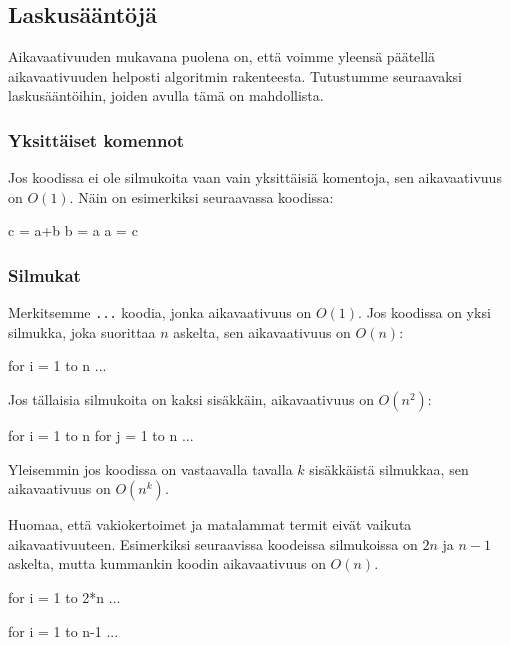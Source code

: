 \subsection{Laskusääntöjä}

Aikavaativuuden mukavana puolena on, että voimme yleensä
päätellä aikavaativuuden helposti algoritmin
rakenteesta. Tutustumme seuraavaksi laskusääntöihin,
joiden avulla tämä on mahdollista.

\subsubsection{Yksittäiset komennot}

Jos koodissa ei ole silmukoita vaan vain
yksittäisiä komentoja, sen aikavaativuus on $O(1)$.
Näin on esimerkiksi seuraavassa koodissa:

\begin{code}
c = a+b
b = a
a = c
\end{code}

\subsubsection{Silmukat}

Merkitsemme \texttt{...} koodia,
jonka aikavaativuus on $O(1)$.
Jos koodissa on yksi silmukka,
joka suorittaa $n$ askelta,
sen aikavaativuus on $O(n)$:

\begin{code}
for i = 1 to n
    ...
\end{code}

Jos tällaisia silmukoita on kaksi sisäkkäin,
aikavaativuus on $O(n^2)$:

\begin{code}
for i = 1 to n
    for j = 1 to n
        ...
\end{code}

Yleisemmin jos koodissa on vastaavalla tavalla
$k$ sisäkkäistä silmukkaa, sen aikavaativuus on $O(n^k)$.


Huomaa, että vakiokertoimet ja matalammat termit eivät vaikuta aikavaativuuteen.
Esimerkiksi seuraavissa koodeissa silmukoissa on $2n$ ja $n-1$ askelta,
mutta kummankin koodin aikavaativuus on $O(n)$.

\begin{code}
for i = 1 to 2*n
    ...
\end{code}

\begin{code}
for i = 1 to n-1
    ...
\end{code}


